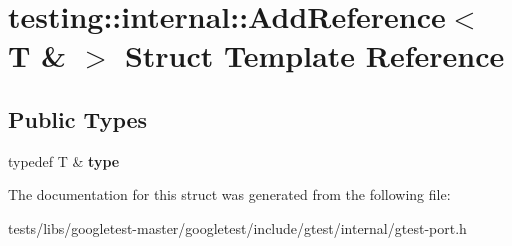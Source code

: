 \hypertarget{structtesting_1_1internal_1_1AddReference_3_01T_01_6_01_4}{}\section{testing\+:\+:internal\+:\+:Add\+Reference$<$ T \& $>$ Struct Template Reference}
\label{structtesting_1_1internal_1_1AddReference_3_01T_01_6_01_4}
\subsection*{Public Types}
\begin{DoxyCompactItemize}
\item 
\mbox{\label{structtesting_1_1internal_1_1AddReference_3_01T_01_6_01_4_a93c064cdcdaced0abd167258425e57af}} 
typedef T \& {\bfseries type}
\end{DoxyCompactItemize}


The documentation for this struct was generated from the following file\+:\begin{DoxyCompactItemize}
\item 
tests/libs/googletest-\/master/googletest/include/gtest/internal/gtest-\/port.\+h\end{DoxyCompactItemize}
